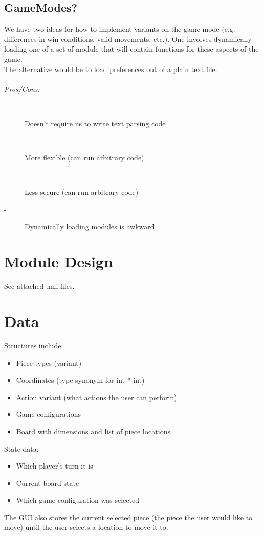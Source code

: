 \documentclass[11pt, oneside]{article}
\begin{document}
\subsection{GameModes?}
We have two ideas for how to implement variants on the game mode (e.g.
differences in win conditions, valid movements, etc.). One involves dynamically
loading one of a set of module that will contain functions for these aspects of
the game.\\
The alternative would be to load preferences out of a plain text file.\\\\
\textit{Pros/Cons:}
\begin{description}
\item[+] Doesn't require us to write text parsing code
\item[+] More flexible (can run arbitrary code)
\item[-] Less secure (can run arbitrary code)
\item[-] Dynamically loading modules is awkward
\end{description}

\section{Module Design}
See attached .mli files.

\section{Data}
Structures include:
\begin{itemize}
\item Piece types (variant)
\item Coordinates (type synonym for int * int)
\item Action variant (what actions the user can perform)
\item Game configurations
\item Board with dimensions and list of piece locations
\end{itemize}

State data:
\begin{itemize}
\item Which player's turn it is
\item Current board state
\item Which game configuration was selected
\end{itemize}
The GUI also stores the current selected piece (the piece the user would like to
move) until the user selects a location to move it to.
\end{document}
